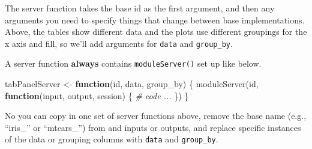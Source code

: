 \documentclass[
]{book}
\newenvironment{Shaded}{\begin{snugshade}}{\end{snugshade}}
\newcommand{\AttributeTok}[1]{\textcolor[rgb]{0.77,0.63,0.00}{#1}}
\newcommand{\CommentTok}[1]{\textcolor[rgb]{0.56,0.35,0.01}{\textit{#1}}}
\newcommand{\ConstantTok}[1]{\textcolor[rgb]{0.00,0.00,0.00}{#1}}
\newcommand{\ControlFlowTok}[1]{\textcolor[rgb]{0.13,0.29,0.53}{\textbf{#1}}}
\newcommand{\FloatTok}[1]{\textcolor[rgb]{0.00,0.00,0.81}{#1}}
\newcommand{\FunctionTok}[1]{\textcolor[rgb]{0.00,0.00,0.00}{#1}}
\newcommand{\NormalTok}[1]{#1}
\newcommand{\OtherTok}[1]{\textcolor[rgb]{0.56,0.35,0.01}{#1}}
\newcommand{\SpecialCharTok}[1]{\textcolor[rgb]{0.00,0.00,0.00}{#1}}
\begin{document}
The server function takes the base id as the first argument, and then any arguments you need to specify things that change between base implementations. Above, the tables show different data and the plots use different groupings for the x axis and fill, so we'll add arguments for \texttt{data} and \texttt{group\_by}.

A server function \textbf{always} contains \texttt{moduleServer()} set up like below.

\begin{Shaded}
\begin{Highlighting}[]
\NormalTok{tabPanelServer }\OtherTok{\textless{}{-}} \ControlFlowTok{function}\NormalTok{(id, data, group\_by) \{}
    \FunctionTok{moduleServer}\NormalTok{(id, }\ControlFlowTok{function}\NormalTok{(input, output, session) \{}
      \CommentTok{\# code ...}
\NormalTok{    \})}
\NormalTok{\}}
\end{Highlighting}
\end{Shaded}

No you can copy in one set of server functions above, remove the base name (e.g., ``iris\_'' or ``mtcars\_'') from and inputs or outputs, and replace specific instances of the data or grouping columns with \texttt{data} and \texttt{group\_by}.

\begin{Shaded}
\end{Shaded}
\end{document}

